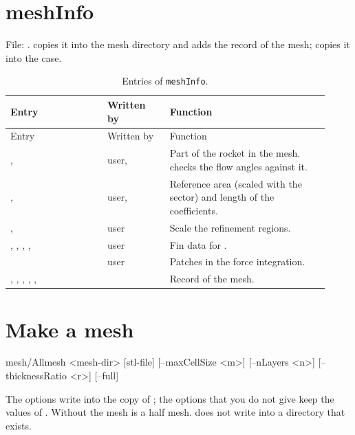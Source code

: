 \section{meshInfo}\label{sec:meshinfo}

File: .  copies it into the mesh directory and adds
the record of the mesh;  copies it into the case.

\begin{longtable}{@{}P{0.28\linewidth} P{0.18\linewidth} P{0.46\linewidth}@{}}
\caption{Entries of \texttt{meshInfo}.}\label{tab:meshinfo}\\
\toprule
Entry & Written by & Function \\
\midrule
\endfirsthead
\toprule
Entry & Written by & Function \\
\midrule
\endhead
{},  & user,  & Part of the rocket in the mesh.  checks the flow angles against it. \\
,  & user,  & Reference area (scaled with the sector) and length of the coefficients. \\
,  & user & Scale the refinement regions. \\
, , , ,  & user & Fin data for . \\
 & user & Patches in the force integration. \\
, , , , ,  &  & Record of the mesh. \\
\bottomrule
\end{longtable}

\section{Make a mesh}\label{sec:allmesh}

\begin{shell}
mesh/Allmesh <mesh-dir> [stl-file] [--maxCellSize <m>] [--nLayers <n>]
             [--thicknessRatio <r>] [--full]
\end{shell}

The options write into the copy of ; the options that you do not give
keep the values of . Without  the mesh is a half
mesh.  does not write into a directory that exists.

